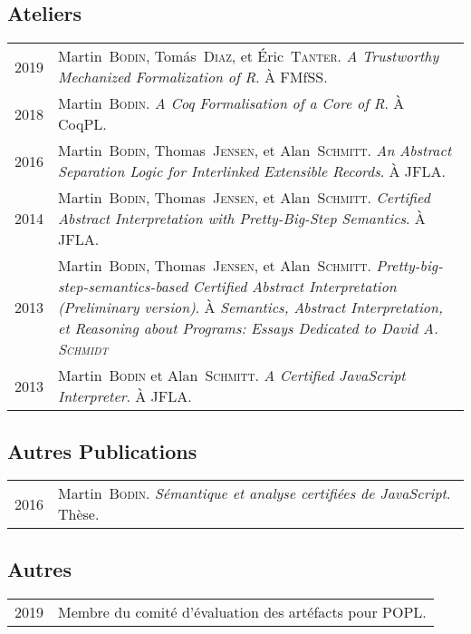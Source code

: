 \documentclass[12pt,a4paper]{article}
\makeatletter
\newenvironment{datecvsection}[1]%
               {\subsection*{#1}%
                 \noindent \begin{tabular}{@{}p{\annee}p{\texte}@{}}}
               {\end{tabular}}
\newcommand\familyName{\textsc}
\makeatother
\begin{document}
\begin{datecvsection}{Ateliers}

  2019 & Martin~\familyName{Bodin}, Tomás~\familyName{Diaz}, et Éric~\familyName{Tanter}. \textit{A Trustworthy Mechanized Formalization of R}. À FMfSS. \\

  2018 & Martin~\familyName{Bodin}. \textit{A Coq Formalisation of a Core of R}. À CoqPL. \\

  2016 & Martin~\familyName{Bodin}, Thomas~\familyName{Jensen}, et Alan~\familyName{Schmitt}. \textit{An Abstract Separation Logic for Interlinked Extensible Records}. À JFLA. \\

  2014 & Martin~\familyName{Bodin}, Thomas~\familyName{Jensen}, et Alan~\familyName{Schmitt}. \textit{Certified Abstract Interpretation with Pretty-Big-Step Semantics}. À JFLA. \\

  2013 & Martin~\familyName{Bodin}, Thomas~\familyName{Jensen}, et Alan~\familyName{Schmitt}. \textit{Pretty-big-step-semantics-based Certified Abstract Interpretation (Preliminary version)}. À \textit{Semantics, Abstract Interpretation, et Reasoning about Programs: Essays Dedicated to David A. \textsc{Schmidt}} \\ %

  2013 & Martin~\familyName{Bodin} et Alan~\familyName{Schmitt}. \textit{A Certified JavaScript Interpreter}. À JFLA. \\

\end{datecvsection}

\begin{datecvsection}{Autres Publications}

    2016 & Martin~\familyName{Bodin}. \textit{Sémantique et analyse certifiées de JavaScript}. Thèse. \\

\end{datecvsection}

\begin{datecvsection}{Autres}

    2019 & Membre du comité d’évaluation des artéfacts pour POPL. \\

\end{datecvsection}
\end{document}

